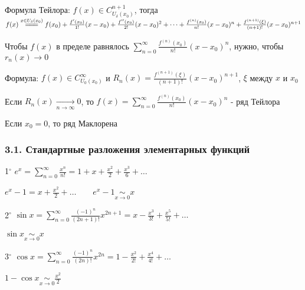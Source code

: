 \documentclass[12pt]{article}
\begin{document}
    \Mem Формула Тейлора: $f(x) \in C^{n + 1}_{U_\delta (x_0)}$, тогда $f(x) \overset{x \in U_\delta (x_0)}{=\joinrel=\joinrel=} f(x_0) + 
    \frac{f^\prime (x_0)}{1!} (x - x_0) + \frac{f^{\prime\prime} (x_0)}{2!} (x - x_0)^2 + \dots + \frac{f^{(n)} (x_0)}{n!} (x - x_0)^n + \frac{f^{(n + 1)} (\xi)}{(n + 1)!} (x - x_0)^{n + 1}$

    Чтобы $f(x)$ в пределе равнялось $\sum_{n = 0}^\infty \frac{f^{(n)}(x_0)}{n!} (x - x_0)^n$, нужно, чтобы $r_n(x) \to 0$


    Формула: $f(x) \in C^\infty_{U_0(x_0)}$ и $R_n(x) = \frac{f^{(n + 1)}(\xi)}{(n + 1)!} (x - x_0)^{n + 1}$, $\xi$ между $x$ и $x_0$

    \hypertarget{taylorsseries}{}

    \begin{MyTheorem}
        \Ths Если $R_n(x) \underset{n \to \infty}{\longrightarrow} 0$, то $f(x) = \sum_{n = 0}^\infty \frac{f^{(n)}(x_0)}{n!} (x - x_0)^n$ - ряд Тейлора
    \end{MyTheorem}

    \Nota Если $x_0 = 0$, то ряд Маклорена 

    \smallvspace

    \hypertarget{taylorsseriesoffunctions}{}

    \subsubsection{3.1. Стандартные разложения элементарных функций}

    \smallvspace

    1$^\circ$ $e^x = \sum_{n = 0}^\infty \frac{x^n}{n!} = 1 + x + \frac{x^2}{2} + \frac{x^3}{6} + \dots$

    \Notas $e^x - 1 = x + \frac{x^2}{2} + \dots \qquad e^x - 1 \underset{x \to 0}{\sim} x$

    \mediumvspace

    2$^\circ$ $\sin x = \sum_{n = 0}^\infty \frac{(-1)^n}{(2n + 1)!}x^{2n + 1} = x - \frac{x^3}{3!} + \frac{x^5}{5!} + \dots$

    \Notas $\sin x \underset{x \to 0}{\sim} x$

    \mediumvspace

    3$^\circ$ $\cos x = \sum_{n = 0}^\infty \frac{(-1)^n}{(2n)!}x^{2n} = 1 - \frac{x^2}{2!} + \frac{x^4}{4!} + \dots$

    \Notas $1 - \cos x \underset{x \to 0}{\sim} \frac{x^2}{2}$
\end{document}
